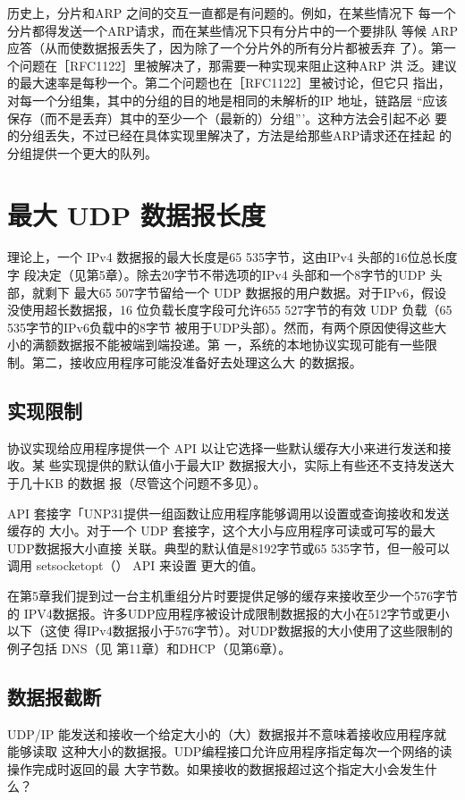 \begin{tcolorbox}
    历史上，分片和ARP 之间的交互一直都是有问题的。例如，在某些情况下
    每一个分片都得发送一个ARP请求，而在某些情况下只有分片中的一个要排队
    等候 ARP应答（从而使数据报丢失了，因为除了一个分片外的所有分片都被丢弃
    了）。第一个问题在［RFC1122］里被解决了，那需要一种实现来阻止这种ARP 洪
    泛。建议的最大速率是每秒一个。第二个问题也在［RFC1122］里被讨论，但它只
    指出，对每一个分组集，其中的分组的目的地是相同的未解析的IP 地址，链路层
    “应该保存（而不是丢弃）其中的至少一个（最新的）分组”’。这种方法会引起不必
    要的分组丢失，不过已经在具体实现里解决了，方法是给那些ARP请求还在挂起
    的分组提供一个更大的队列。
\end{tcolorbox}

\section{最大 UDP 数据报长度}
理论上，一个 IPv4 数据报的最大长度是65 535字节，这由IPv4 头部的16位总长度字
段决定（见第5章）。除去20字节不带选项的IPv4 头部和一个8字节的UDP 头部，就剩下
最大65 507字节留给一个 UDP 数据报的用户数据。对于IPv6，假设没使用超长数据报，16
位负载长度字段可允许655 527字节的有效 UDP 负载（65 535字节的IPv6负载中的8字节
被用于UDP头部）。然而，有两个原因使得这些大小的满额数据报不能被端到端投递。第
一，系统的本地协议实现可能有一些限制。第二，接收应用程序可能没准备好去处理这么大
的数据报。

\subsection{实现限制}
协议实现给应用程序提供一个 API 以让它选择一些默认缓存大小来进行发送和接收。某
些实现提供的默认值小于最大IP 数据报大小，实际上有些还不支持发送大于几十KB 的数据
报（尽管这个问题不多见）。

API 套接字「UNP31提供一组函数让应用程序能够调用以设置或查询接收和发送缓存的
大小。对于一个 UDP 套接字，这个大小与应用程序可读或可写的最大 UDP数据报大小直接
关联。典型的默认值是8192字节或65 535字节，但一般可以调用 setsocketopt（） API 来设置
更大的值。

在第5章我们提到过一台主机重组分片时要提供足够的缓存来接收至少一个576字节的
IPV4数据报。许多UDP应用程序被设计成限制数据报的大小在512字节或更小以下（这使
得IPv4数据报小于576字节）。对UDP数据报的大小使用了这些限制的例子包括 DNS（见
第11章）和DHCP（见第6章）。

\subsection{数据报截断}
UDP/IP 能发送和接收一个给定大小的（大）数据报并不意味着接收应用程序就能够读取
这种大小的数据报。UDP编程接口允许应用程序指定每次一个网络的读操作完成时返回的最
大字节数。如果接收的数据报超过这个指定大小会发生什么？

